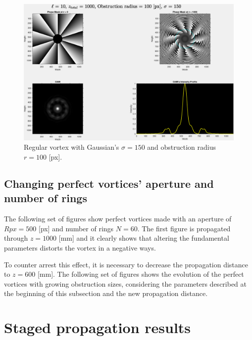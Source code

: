 \begin{figure}[htbp]
    \centering
    \includegraphics[width=12cm]{images/Appendices/Additional_Results/Sigma_150/type=0_r=100_zi=0_zf=1000.eps}
    \caption{Regular vortex with Gaussian's $\sigma = 150$ and obstruction radius $r=100$ [px].}
    \label{fig:reg_s=150_r=100}
\end{figure}

\newpage
\subsection{Changing perfect vortices' aperture and number of rings}
The following set of figures show perfect vortices made with an aperture of $Rpx = 500$ [px] and number of rings $N = 60$. The first figure is propagated through $z = 1000$ [mm] and it clearly shows that altering the fundamental parameters distorts the vortex in a negative ways.



To counter arrest this effect, it is necessary to decrease the propagation distance to $z = 600$ [mm]. The following set of figures shows the evolution of the perfect vortices with growing obstruction sizes, considering the parameters described at the beginning of this subsection and the new propagation distance.



\section{Staged propagation results}